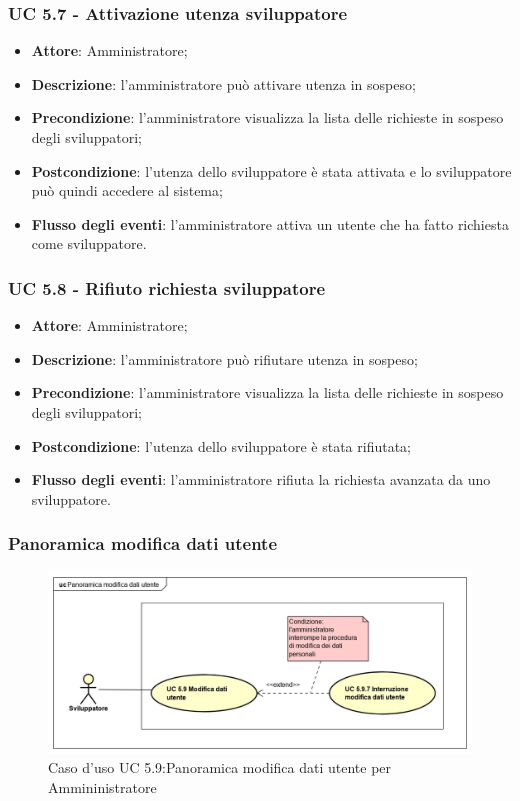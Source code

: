 \subsubsection{UC 5.7 - Attivazione utenza sviluppatore}
\begin{itemize}
\item \textbf{Attore}: Amministratore;
\item \textbf{Descrizione}: l'amministratore può attivare utenza in sospeso;
\item \textbf{Precondizione}: l'amministratore visualizza la lista delle richieste in sospeso degli sviluppatori;
\item \textbf{Postcondizione}: l'utenza dello sviluppatore è stata attivata e lo sviluppatore può quindi accedere al sistema;
\item \textbf{Flusso degli eventi}: l'amministratore attiva un utente che ha fatto richiesta come sviluppatore.
\end{itemize}

\subsubsection{UC 5.8 - Rifiuto richiesta sviluppatore}
\begin{itemize}
\item \textbf{Attore}: Amministratore;
\item \textbf{Descrizione}: l'amministratore può rifiutare utenza in sospeso;
\item \textbf{Precondizione}: l'amministratore visualizza la lista delle richieste in sospeso degli sviluppatori;
\item \textbf{Postcondizione}: l'utenza dello sviluppatore è stata rifiutata;
\item \textbf{Flusso degli eventi}: l'amministratore rifiuta la richiesta avanzata da uno sviluppatore.
\end{itemize}

\subsubsection{Panoramica modifica dati utente}
\begin{figure}[H]
	\centering
	\includegraphics[width=12cm, keepaspectratio]{img/panmod59.png} 
	\caption{Caso d'uso UC 5.9:Panoramica modifica dati utente per Ammininistratore}\label{fig:Panoramica modifica dati utente per Ammininistratore}
\end{figure}

